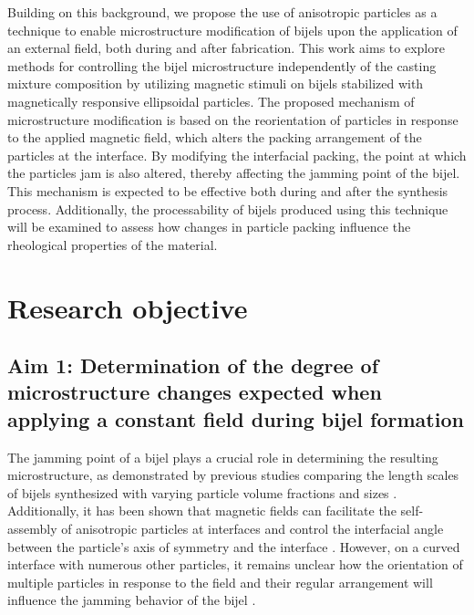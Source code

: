 Building on this background, we propose the use of anisotropic particles as a technique to enable microstructure modification of bijels upon the application 
of an external field, both during and after fabrication. This work aims to explore methods for controlling the bijel microstructure independently of the casting 
mixture composition by utilizing magnetic stimuli on bijels stabilized with magnetically responsive ellipsoidal particles.  
The proposed mechanism of microstructure modification is based on the reorientation of particles in response to the applied magnetic field, which alters the 
packing arrangement of the particles at the interface. By modifying the interfacial packing, the point at which the particles jam is also altered, thereby 
affecting the jamming point of the bijel. This mechanism is expected to be effective both during and after the synthesis process. Additionally, the 
processability of bijels produced using this technique will be examined to assess how changes in particle packing influence the rheological properties of 
the material.  

\section{Research objective}


\subsection{Aim 1: Determination of the degree of microstructure changes expected when applying a constant field during bijel formation}
\label{section:aim1_desc}

The jamming point of a bijel plays a crucial role in determining the resulting microstructure, as demonstrated by previous studies comparing the length scales 
of bijels synthesized with varying particle volume fractions and sizes \cite{jansen_bijels_2011, reeves_particle-size_2015}. Additionally, it has been shown 
that magnetic fields can facilitate the self-assembly of anisotropic particles at interfaces and control the interfacial angle between the particle's axis 
of symmetry and the interface \cite{davies_interface_2014, davies_assembling_2014}. However, on a curved interface with numerous other particles, it remains 
unclear how the orientation of multiple particles in response to the field and their regular arrangement will influence the jamming behavior of the bijel 
\cite{bresme_orientational_2007, davies_interface_2014}.  

